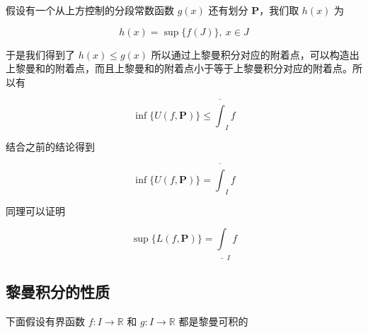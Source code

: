 假设有一个从上方控制的分段常数函数 $g(x)$ 还有划分 $\mathbf{P}$，我们取 $h(x)$ 为

\[
    h(x) = \sup \{ f(J) \}, \: x \in J
\]

于是我们得到了 $h(x) \le g(x)$ 所以通过上黎曼积分对应的附着点，可以构造出上黎曼和的附着点，而且上黎曼和的附着点小于等于上黎曼积分对应的附着点。所以有

\[
 \inf \{ U(f, \mathbf{P}) \}   \le  \overline{\int}_I f
\]

结合之前的结论得到

\[
 \inf \{ U(f, \mathbf{P}) \}  =  \overline{\int}_I f
\]

同理可以证明


\[
 \sup \{ L(f, \mathbf{P}) \}  =  \underline{\int}_I f
\]

\subsection{黎曼积分的性质}

下面假设有界函数 $f: I \to \mathbb{R}$ 和 $g: I \to \mathbb{R}$ 都是黎曼可积的

